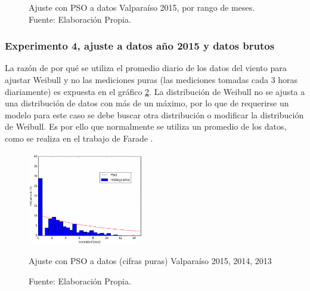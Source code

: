 \begin{figure}[ht!]
{    }%
    \caption{Ajuste con PSO a datos Valparaíso 2015, por rango de meses.\\ Fuente: Elaboración Propia.}
    \label{fig:subfigures}
\end{figure}

\subsubsection{Experimento 4, ajuste a datos año 2015 y datos brutos}
La razón de por qué se utiliza el promedio diario de los datos del viento para ajustar Weibull y no las mediciones puras (las mediciones tomadas cada 3 horas diariamente) es expuesta en el gráfico \ref{fig:pso_valpo_15_all_data}. La distribución de Weibull no se ajusta a una distribución de datos con más de un máximo, por lo que de requerirse un modelo para este caso se debe buscar otra distribución o modificar la distribución de Weibull. Es por ello que normalmente se utiliza un promedio de los datos, como se realiza en el trabajo de Farade \cite{Fadare08}.
\begin{figure}[ht!]
    \centering
    \captionsetup{justification=centering,margin=2cm}
    \includegraphics[width=0.45\textwidth]{figures/result_2015_all_data.png}
    \caption{Ajuste con PSO a datos (cifras puras) Valparaíso 2015, 2014, 2013}
    \vspace{-.25cm}
    \caption*{Fuente: Elaboración Propia.}
    \label{fig:pso_valpo_15_all_data}
\end{figure}
\pagebreak
\newpage
